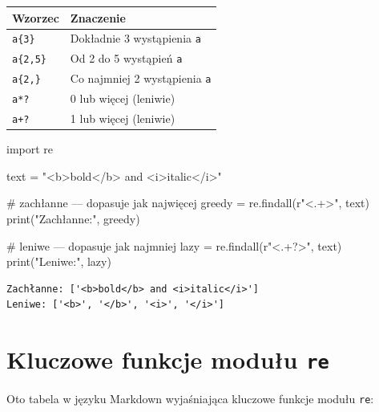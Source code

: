 \documentclass[
  polish,
  letterpaper,
  DIV=11,
  numbers=noendperiod]{scrreprt}
\newenvironment{Shaded}{\begin{snugshade}}{\end{snugshade}}
\newcommand{\BuiltInTok}[1]{\textcolor[rgb]{0.00,0.23,0.31}{#1}}
\newcommand{\CommentTok}[1]{\textcolor[rgb]{0.37,0.37,0.37}{#1}}
\newcommand{\DecValTok}[1]{\textcolor[rgb]{0.68,0.00,0.00}{#1}}
\newcommand{\ImportTok}[1]{\textcolor[rgb]{0.00,0.46,0.62}{#1}}
\newcommand{\NormalTok}[1]{\textcolor[rgb]{0.00,0.23,0.31}{#1}}
\newcommand{\OperatorTok}[1]{\textcolor[rgb]{0.37,0.37,0.37}{#1}}
\newcommand{\StringTok}[1]{\textcolor[rgb]{0.13,0.47,0.30}{#1}}
\newcommand{\VerbatimStringTok}[1]{\textcolor[rgb]{0.13,0.47,0.30}{#1}}
\newcounter{none} %
\begin{document}
{\def\LTcaptype{none} %
\begin{longtable}[]{@{}ll@{}}
\toprule\noalign{}
Wzorzec & Znaczenie \\
\midrule\noalign{}
\endhead
\bottomrule\noalign{}
\endlastfoot
\texttt{a\{3\}} & Dokładnie 3 wystąpienia \texttt{a} \\
\texttt{a\{2,5\}} & Od 2 do 5 wystąpień \texttt{a} \\
\texttt{a\{2,\}} & Co najmniej 2 wystąpienia \texttt{a} \\
\texttt{a*?} & 0 lub więcej (leniwie) \\
\texttt{a+?} & 1 lub więcej (leniwie) \\
\end{longtable}
}

\begin{Shaded}
\begin{Highlighting}[]
\ImportTok{import}\NormalTok{ re}

\NormalTok{text }\OperatorTok{=} \StringTok{"\textless{}b\textgreater{}bold\textless{}/b\textgreater{} and \textless{}i\textgreater{}italic\textless{}/i\textgreater{}"}

\CommentTok{\# zachłanne — dopasuje jak najwięcej}
\NormalTok{greedy }\OperatorTok{=}\NormalTok{ re.findall(}\VerbatimStringTok{r"\textless{}}\DecValTok{.}\OperatorTok{+}\VerbatimStringTok{\textgreater{}"}\NormalTok{, text)}
\BuiltInTok{print}\NormalTok{(}\StringTok{"Zachłanne:"}\NormalTok{, greedy)}

\CommentTok{\# leniwe — dopasuje jak najmniej}
\NormalTok{lazy }\OperatorTok{=}\NormalTok{ re.findall(}\VerbatimStringTok{r"\textless{}}\DecValTok{.}\OperatorTok{+?}\VerbatimStringTok{\textgreater{}"}\NormalTok{, text)}
\BuiltInTok{print}\NormalTok{(}\StringTok{"Leniwe:"}\NormalTok{, lazy)}
\end{Highlighting}
\end{Shaded}

\begin{verbatim}
Zachłanne: ['<b>bold</b> and <i>italic</i>']
Leniwe: ['<b>', '</b>', '<i>', '</i>']
\end{verbatim}

\section{\texorpdfstring{Kluczowe funkcje modułu
\texttt{re}}{Kluczowe funkcje modułu re}}\label{kluczowe-funkcje-moduux142u-re}

Oto tabela w języku Markdown wyjaśniająca kluczowe funkcje modułu
\texttt{re}:
\end{document}
